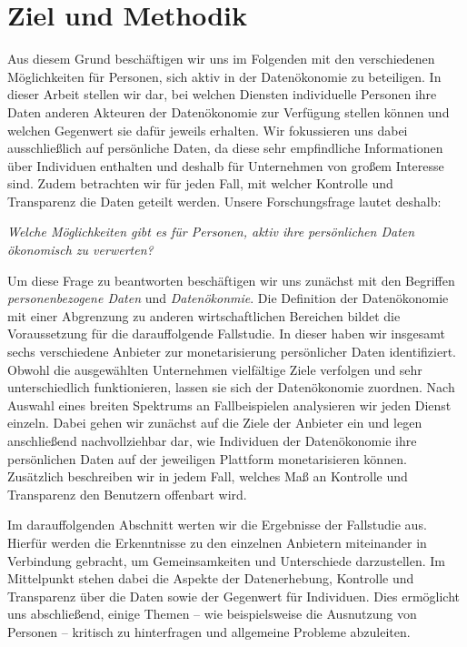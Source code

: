 \section{Ziel und Methodik}
Aus diesem Grund beschäftigen wir uns im Folgenden mit den verschiedenen Möglichkeiten für Personen, sich aktiv in der Datenökonomie zu beteiligen. In dieser Arbeit stellen wir dar, bei welchen Diensten individuelle Personen ihre Daten anderen Akteuren der Datenökonomie zur Verfügung stellen können und welchen Gegenwert sie dafür jeweils erhalten. Wir fokussieren uns dabei ausschließlich auf persönliche Daten, da diese sehr empfindliche Informationen über Individuen enthalten und deshalb für Unternehmen von großem Interesse sind. Zudem betrachten wir für jeden Fall, mit welcher Kontrolle und Transparenz die Daten geteilt werden. Unsere Forschungsfrage lautet deshalb:

\begin{center}
\textit{Welche Möglichkeiten gibt es für Personen, aktiv ihre persönlichen Daten ökonomisch zu verwerten?}
\end{center}

\noindent Um diese Frage zu beantworten beschäftigen wir uns zunächst mit den Begriffen \textit{personenbezogene Daten} und \textit{Datenökonmie}. Die Definition der Datenökonomie mit einer Abgrenzung zu anderen wirtschaftlichen Bereichen bildet die Voraussetzung für die darauffolgende Fallstudie. In dieser haben wir insgesamt sechs verschiedene Anbieter zur monetarisierung persönlicher Daten identifiziert. Obwohl die ausgewählten Unternehmen vielfältige Ziele verfolgen und sehr unterschiedlich funktionieren, lassen sie sich der Datenökonomie zuordnen. Nach Auswahl eines breiten Spektrums an Fallbeispielen analysieren wir jeden Dienst einzeln. Dabei gehen wir zunächst auf die Ziele der Anbieter ein und legen anschließend nachvollziehbar dar, wie Individuen der Datenökonomie ihre persönlichen Daten auf der jeweiligen Plattform monetarisieren können. Zusätzlich beschreiben wir in jedem Fall, welches Maß an Kontrolle und Transparenz den Benutzern offenbart wird. \newline

\noindent Im darauffolgenden Abschnitt werten wir die Ergebnisse der Fallstudie aus. Hierfür werden die Erkenntnisse zu den einzelnen Anbietern miteinander in Verbindung gebracht, um Gemeinsamkeiten und Unterschiede darzustellen. Im Mittelpunkt stehen dabei die Aspekte der Datenerhebung, Kontrolle und Transparenz über die Daten sowie der Gegenwert für Individuen. Dies ermöglicht uns abschließend, einige Themen -- wie beispielsweise die Ausnutzung von Personen -- kritisch zu hinterfragen und allgemeine Probleme abzuleiten. 